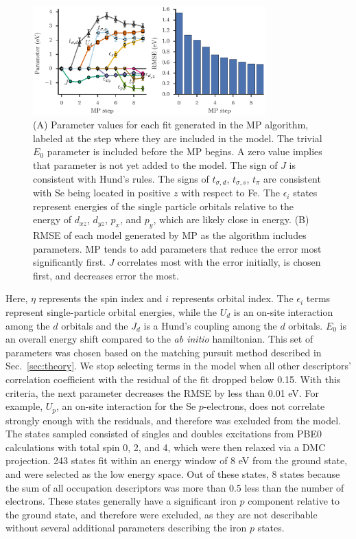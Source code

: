 \begin{figure}
  \centering
  \includegraphics[width=0.8\textwidth]{./Figures/fese.eps}
  \caption{
    \label{fig:fese} 
    (A) Parameter values for each fit generated in the MP algorithm, labeled at the step where they are included in the model. 
    The trivial $E_0$ parameter is included before the MP begins.
    A zero value implies that parameter is not yet added to the model.
    The sign of $J$ is consistent with Hund's rules. 
    The signs of $t_{\sigma,d}$, $t_{\sigma,s}$, $t_\pi$ are consistent with Se being located in positive $z$ with respect to Fe. 
    The $\epsilon_i$ states represent energies of the single particle orbitals relative to the energy of $d_{xz}$, $d_{yz}$, $p_x$, and $p_y$, which are likely close in energy.
    (B) RMSE of each model generated by MP as the algorithm includes parameters. 
    MP tends to add parameters that reduce the error most significantly first. 
    $J$ correlates most with the error initially, is chosen first, and decreases error the most.
  }
\end{figure}
Here, $\eta$ represents the spin index and $i$ represents orbital index.
The $\epsilon_i$ terms represent single-particle orbital energies, while the $U_d$ is an on-site interaction among the $d$ orbitals and the $J_d$ is a Hund's coupling among the $d$ orbitals.
$E_0$ is an overall energy shift compared to the \textit{ab initio} hamiltonian.
This set of parameters was chosen based on the matching pursuit method described in Sec.~\ref{sec:theory}.
We stop selecting terms in the model when all other descriptors' correlation coefficient with the residual of the fit dropped below 0.15.
With this criteria, the next parameter decreases the RMSE by less than 0.01 eV.
For example, $U_p$, an on-site interaction for the Se $p$-electrons, does not correlate strongly enough with the residuals, and therefore was excluded from the model.
The states sampled consisted of singles and doubles excitations from PBE0 calculations with total spin 0, 2, and 4, which were then relaxed via a DMC projection.
243 states fit within an energy window of 8 eV from the ground state, and were selected as the low energy space.
Out of these states, 8 states because the sum of all occupation descriptors was more than 0.5 less than the number of electrons.
These states generally have a significant iron $p$ component relative to the ground state, and therefore were excluded, as they are not describable without several additional parameters describing the iron $p$ states.

